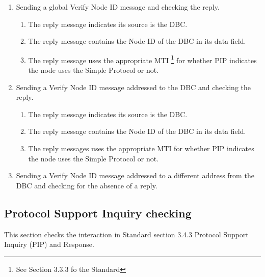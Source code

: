\begin{enumerate}
\item Sending a global Verify Node ID message and checking the reply.
    \begin{enumerate}
    \item The reply message indicates its source is the DBC.
    \item The reply message contains the Node ID of the DBC in its data field.
    \item The reply message uses the appropriate MTI
            \footnote{See Section 3.3.3 fo the Standard}
            for whether PIP indicates the node 
            uses the Simple Protocol or not.
    \end{enumerate}

\item Sending a Verify Node ID message addressed to the DBC and checking the reply.
    \begin{enumerate}
    \item The reply message indicates its source is the DBC.
    \item The reply message contains the Node ID of the DBC in its data field.
    \item The reply messages uses the appropriate MTI for whether PIP indicates the node 
            uses the Simple Protocol or not.
    \end{enumerate}

\item Sending a Verify Node ID message addressed to a different address from the DBC
        and checking for the absence of a reply.
\end{enumerate}

\subsection{Protocol Support Inquiry checking}

This section checks the interaction in 
Standard section 3.4.3 Protocol Support Inquiry (PIP) and Response.

